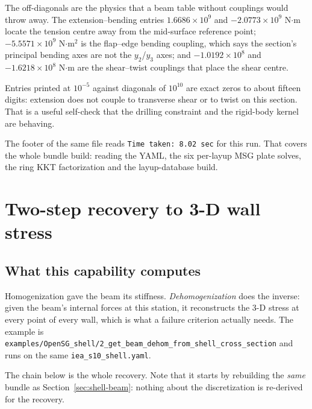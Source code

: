 The off-diagonals are the physics that a beam table without couplings would throw
away. The extension--bending entries $1.6686\times10^{9}$ and
$-2.0773\times10^{9}$ N$\cdot$m locate the tension centre away from the
mid-surface reference point; $-5.5571\times10^{9}$ N$\cdot$m$^2$ is the
flap--edge bending coupling, which says the section's principal bending axes are
not the $y_2$/$y_3$ axes; and $-1.0192\times10^{8}$ and $-1.6218\times10^{8}$
N$\cdot$m are the shear--twist couplings that place the shear centre.

Entries printed at $10^{-5}$ against diagonals of $10^{10}$ are exact zeros to
about fifteen digits: extension does not couple to transverse shear or to twist
on this section. That is a useful self-check that the drilling constraint and the
rigid-body kernel are behaving.

The footer of the same file reads \texttt{Time taken: 8.02 sec} for this run.
That covers the whole bundle build: reading the YAML, the six per-layup MSG plate
solves, the ring KKT factorization and the layup-database build.

\section{Two-step recovery to 3-D wall stress}
\label{sec:shell-dehom}

\subsection{What this capability computes}

Homogenization gave the beam its stiffness. \emph{Dehomogenization} does the
inverse: given the beam's internal forces at this station, it reconstructs the
3-D stress at every point of every wall, which is what a failure criterion
actually needs. The example is
\texttt{examples/OpenSG\_shell/2\_get\_beam\_dehom\_from\_shell\_cross\_section}
and runs on the same \texttt{iea\_s10\_shell.yaml}.

The chain below is the whole recovery. Note that it starts by rebuilding the
\emph{same} bundle as Section~\ref{sec:shell-beam}: nothing about the
discretization is re-derived for the recovery.

